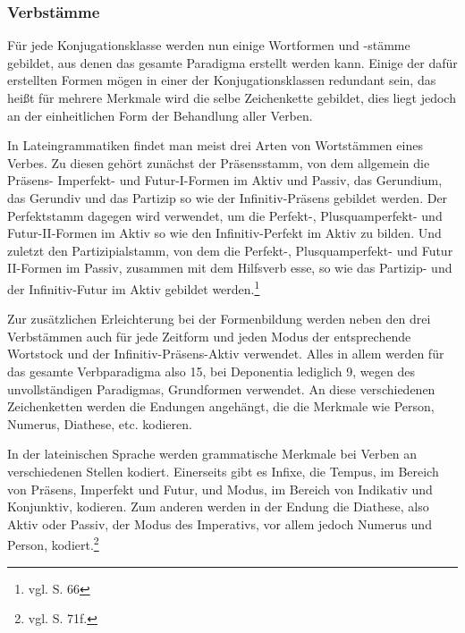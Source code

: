 \subsubsection{Verbstämme}
Für jede Konjugationsklasse werden nun einige Wortformen und -stämme gebildet, aus denen das gesamte Paradigma erstellt werden kann. Einige der dafür erstellten Formen mögen in einer der Konjugationsklassen redundant sein, das heißt für mehrere Merkmale wird die selbe Zeichenkette gebildet, dies liegt jedoch an der einheitlichen Form der Behandlung aller Verben. \par
In Lateingrammatiken findet man meist drei Arten von Wortstämmen eines Verbes. Zu diesen gehört zunächst der Präsensstamm, von dem allgemein die Präsens- Imperfekt- und Futur-I-Formen im Aktiv und Passiv, das Gerundium, das Gerundiv und das Partizip so wie der Infinitiv-Präsens gebildet werden. Der Perfektstamm dagegen wird verwendet, um die Perfekt-, Plusquamperfekt- und Futur-II-Formen im Aktiv so wie den Infinitiv-Perfekt im Aktiv zu bilden. Und zuletzt den Partizipialstamm, von dem die Perfekt-, Plusquamperfekt- und Futur II-Formen im Passiv, zusammen mit dem Hilfsverb esse, so wie das Partizip- und der Infinitiv-Futur im Aktiv gebildet werden.\footnote{vgl. \cite{BAYER-LINDAUER1994} S. 66} \par
Zur zusätzlichen Erleichterung bei der Formenbildung werden neben den drei Verbstämmen auch für jede Zeitform und jeden Modus der entsprechende Wortstock und der Infinitiv-Präsens-Aktiv verwendet. Alles in allem werden für das gesamte Verbparadigma also 15, bei Deponentia lediglich 9, wegen des unvollständigen Paradigmas, Grundformen verwendet. An diese verschiedenen Zeichenketten werden die Endungen angehängt, die die Merkmale wie Person, Numerus, Diathese, etc. kodieren. \par
In der lateinischen Sprache werden grammatische Merkmale bei Verben an verschiedenen Stellen kodiert. Einerseits gibt es Infixe, die Tempus, im Bereich von Präsens, Imperfekt und Futur, und Modus, im Bereich von Indikativ und Konjunktiv, kodieren. Zum anderen werden in der Endung die Diathese, also Aktiv oder Passiv, der Modus des Imperativs, vor allem jedoch Numerus und Person, kodiert.\footnote{vgl. \cite{BAYER-LINDAUER1994} S. 71f.} \par
